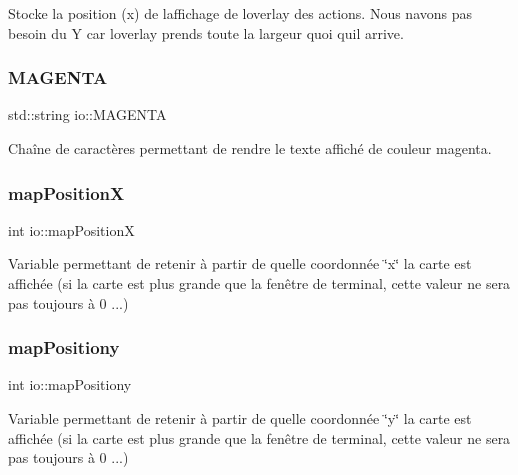 Stocke la position (x) de l\textquotesingle{}affichage de l\textquotesingle{}overlay des actions. Nous n\textquotesingle{}avons pas besoin du Y car l\textquotesingle{}overlay prends toute la largeur quoi qu\textquotesingle{}il arrive. 

\mbox{\label{namespaceio_a1e4a43cea85f576e62aebce6aabc60b5}} 
\subsubsection{\texorpdfstring{M\+A\+G\+E\+N\+TA}{MAGENTA}}
{\footnotesize\ttfamily std\+::string io\+::\+M\+A\+G\+E\+N\+TA}



Chaîne de caractères permettant de rendre le texte affiché de couleur magenta. 

\mbox{\label{namespaceio_a7f2af984af03881a45da957db2c48be2}} 
\subsubsection{\texorpdfstring{map\+PositionX}{mapPositionX}}
{\footnotesize\ttfamily int io\+::map\+PositionX}



Variable permettant de retenir à partir de quelle coordonnée \char`\"{}x\char`\"{} la carte est affichée (si la carte est plus grande que la fenêtre de terminal, cette valeur ne sera pas toujours à 0 ...) 

\mbox{\label{namespaceio_aa0322ffa705df7bd3c4fa5eaefde5d6d}} 
\subsubsection{\texorpdfstring{map\+Positiony}{mapPositiony}}
{\footnotesize\ttfamily int io\+::map\+Positiony}



Variable permettant de retenir à partir de quelle coordonnée \char`\"{}y\char`\"{} la carte est affichée (si la carte est plus grande que la fenêtre de terminal, cette valeur ne sera pas toujours à 0 ...) 

